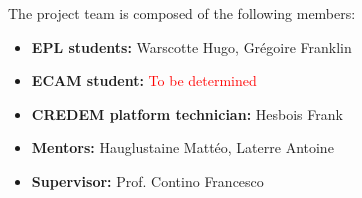 The project team is composed of the following members:
\begin{itemize}
    \item \textbf{EPL students:} Warscotte Hugo, Grégoire Franklin
    \item \textbf{ECAM student:} \textcolor{red}{To be determined}
    \item \textbf{CREDEM platform technician:} Hesbois Frank
    \item \textbf{Mentors:} Hauglustaine Mattéo, Laterre Antoine
    \item \textbf{Supervisor:} Prof. Contino Francesco
\end{itemize}